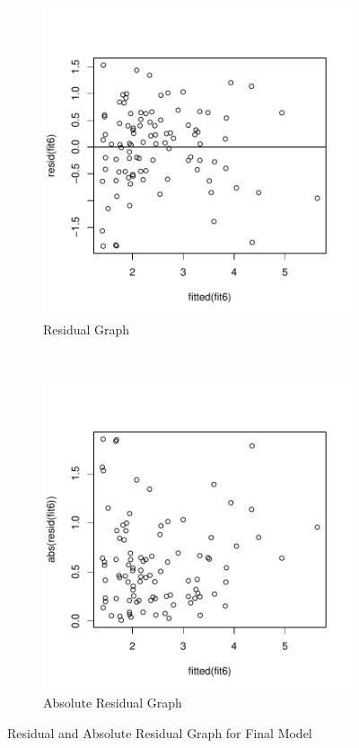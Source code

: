 \documentclass[12pt,letterpaper,titlepage,en-US]{article}
\begin{document}
\begin{figure}[H]
    \centering
    \begin{subfigure}[t]{0.5\textwidth}
        \centering
        \caption{Residual Graph}\label{rgmqf}
        \includegraphics[width=.95\textwidth]{fig/residualplotfit6.pdf}
    \end{subfigure}%
    ~
    \begin{subfigure}[t]{0.5\textwidth}
        \centering
        \caption{Absolute Residual Graph}\label{abrgmqf}
        \includegraphics[width=.95\textwidth]{fig/plotfit6abu.pdf}
    \end{subfigure}
    \caption{Residual and Absolute Residual Graph for Final Model}
\end{figure}
\end{document}
